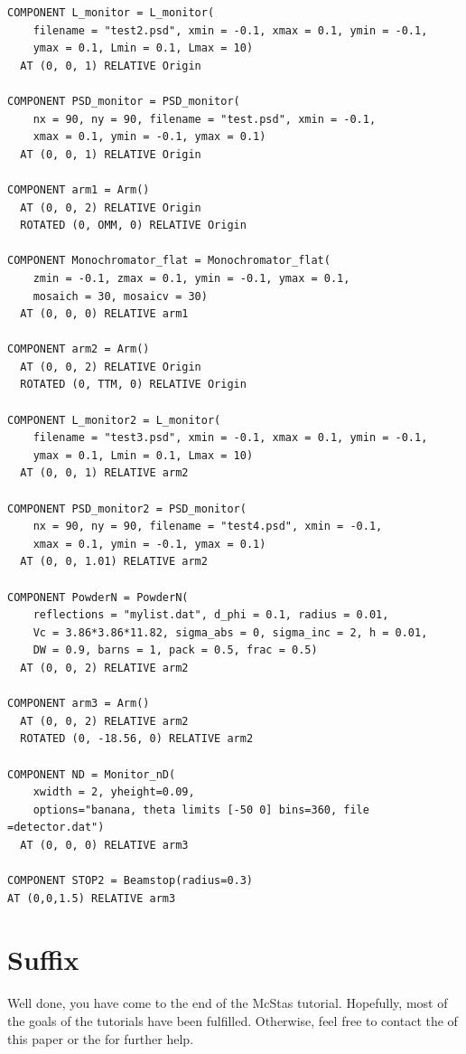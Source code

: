 \begin{verbatim}
COMPONENT L_monitor = L_monitor(
    filename = "test2.psd", xmin = -0.1, xmax = 0.1, ymin = -0.1,
    ymax = 0.1, Lmin = 0.1, Lmax = 10)
  AT (0, 0, 1) RELATIVE Origin

COMPONENT PSD_monitor = PSD_monitor(
    nx = 90, ny = 90, filename = "test.psd", xmin = -0.1,
    xmax = 0.1, ymin = -0.1, ymax = 0.1)
  AT (0, 0, 1) RELATIVE Origin

COMPONENT arm1 = Arm()
  AT (0, 0, 2) RELATIVE Origin
  ROTATED (0, OMM, 0) RELATIVE Origin

COMPONENT Monochromator_flat = Monochromator_flat(
    zmin = -0.1, zmax = 0.1, ymin = -0.1, ymax = 0.1,
    mosaich = 30, mosaicv = 30)
  AT (0, 0, 0) RELATIVE arm1

COMPONENT arm2 = Arm()
  AT (0, 0, 2) RELATIVE Origin
  ROTATED (0, TTM, 0) RELATIVE Origin

COMPONENT L_monitor2 = L_monitor(
    filename = "test3.psd", xmin = -0.1, xmax = 0.1, ymin = -0.1,
    ymax = 0.1, Lmin = 0.1, Lmax = 10)
  AT (0, 0, 1) RELATIVE arm2

COMPONENT PSD_monitor2 = PSD_monitor(
    nx = 90, ny = 90, filename = "test4.psd", xmin = -0.1,
    xmax = 0.1, ymin = -0.1, ymax = 0.1)
  AT (0, 0, 1.01) RELATIVE arm2

COMPONENT PowderN = PowderN(
    reflections = "mylist.dat", d_phi = 0.1, radius = 0.01,
    Vc = 3.86*3.86*11.82, sigma_abs = 0, sigma_inc = 2, h = 0.01,
    DW = 0.9, barns = 1, pack = 0.5, frac = 0.5)
  AT (0, 0, 2) RELATIVE arm2

COMPONENT arm3 = Arm()
  AT (0, 0, 2) RELATIVE arm2
  ROTATED (0, -18.56, 0) RELATIVE arm2
 
COMPONENT ND = Monitor_nD(
    xwidth = 2, yheight=0.09, 
    options="banana, theta limits [-50 0] bins=360, file =detector.dat")
  AT (0, 0, 0) RELATIVE arm3

COMPONENT STOP2 = Beamstop(radius=0.3)
AT (0,0,1.5) RELATIVE arm3

\end{verbatim}
\section{Suffix}
Well done, you have come to the end of the McStas tutorial. Hopefully,
most of the goals of the tutorials have been fulfilled. Otherwise,
feel free to contact the
of this paper or the  for further help.

